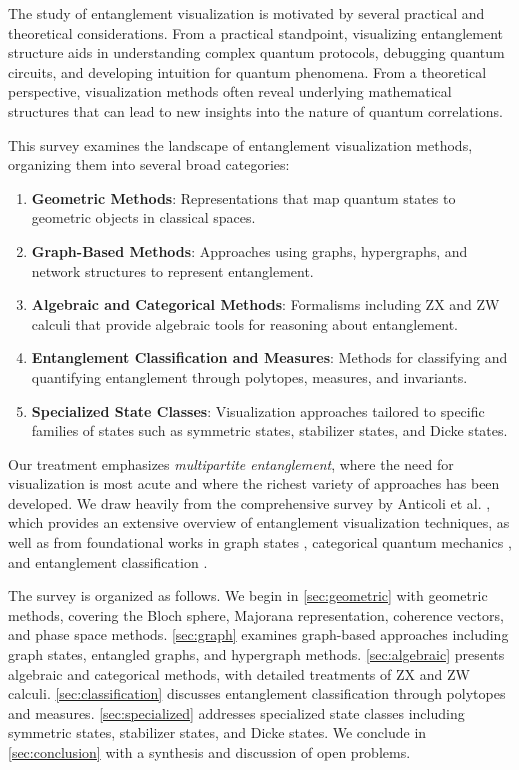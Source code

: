 \documentclass[12pt,a4paper]{article}
\begin{document}
The study of entanglement visualization is motivated by several practical and theoretical considerations. From a practical standpoint, visualizing entanglement structure aids in understanding complex quantum protocols, debugging quantum circuits, and developing intuition for quantum phenomena. From a theoretical perspective, visualization methods often reveal underlying mathematical structures that can lead to new insights into the nature of quantum correlations.

This survey examines the landscape of entanglement visualization methods, organizing them into several broad categories:

\begin{enumerate}
	\item \textbf{Geometric Methods}: Representations that map quantum states to geometric objects in classical spaces.
	\item \textbf{Graph-Based Methods}: Approaches using graphs, hypergraphs, and network structures to represent entanglement.
	\item \textbf{Algebraic and Categorical Methods}: Formalisms including ZX and ZW calculi that provide algebraic tools for reasoning about entanglement.
	\item \textbf{Entanglement Classification and Measures}: Methods for classifying and quantifying entanglement through polytopes, measures, and invariants.
	\item \textbf{Specialized State Classes}: Visualization approaches tailored to specific families of states such as symmetric states, stabilizer states, and Dicke states.
\end{enumerate}

Our treatment emphasizes \emph{multipartite entanglement}, where the need for visualization is most acute and where the richest variety of approaches has been developed. We draw heavily from the comprehensive survey by Anticoli et al. \cite{Undermind}, which provides an extensive overview of entanglement visualization techniques, as well as from foundational works in graph states \cite{hein2004entanglement,hein2006multiparty}, categorical quantum mechanics \cite{cqm}, and entanglement classification \cite{EntangledGraphs,Gharahi2016}.

The survey is organized as follows. We begin in \cref{sec:geometric} with geometric methods, covering the Bloch sphere, Majorana representation, coherence vectors, and phase space methods. \cref{sec:graph} examines graph-based approaches including graph states, entangled graphs, and hypergraph methods. \cref{sec:algebraic} presents algebraic and categorical methods, with detailed treatments of ZX and ZW calculi. \cref{sec:classification} discusses entanglement classification through polytopes and measures. \cref{sec:specialized} addresses specialized state classes including symmetric states, stabilizer states, and Dicke states. We conclude in \cref{sec:conclusion} with a synthesis and discussion of open problems.
\end{document}
